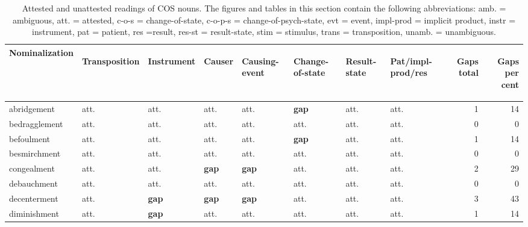 \begin{table}
\caption{Attested and unattested readings of COS nouns. The figures and tables in this section contain the following abbreviations: amb. = ambiguous, att. = attested, \mbox{c-o-s} = change-of-state, c-o-p-s = change-of-psych-state, evt = event, impl-prod = implicit product, instr = instrument, pat = patient, res =result, res-st = result-state, stim = stimulus, trans = transposition, unamb. = unambiguous.} 
\label{tab:GapsCOS}
\begin{tabular}{llllllllrr}
\lsptoprule
Nominalization             & \begin{sideways}Transposition\end{sideways} & \begin{sideways}Instrument\end{sideways} & \begin{sideways}Causer\end{sideways} & \begin{sideways}Causing-event\end{sideways} & \begin{sideways}Change-of-state\end{sideways} & \begin{sideways}Result-state\end{sideways} & \begin{sideways}Pat/impl-prod/res\end{sideways} & \begin{sideways}Gaps total\end{sideways} &
\begin{sideways}Gaps per cent\end{sideways}\\
\midrule
 abridgement& att.& att.& att. & att.& \textbf{gap} & att. & att. & 1 & 14 \\
bedragglement& att.& att.& att. & att.& att.& att. & att. & 0 & 0\\
 befoulment & att.& att.& att. & att.& \textbf{gap} & att. & att. & 1 & 14 \\
besmirchment & att.& att.& att. & att.& att.& att. & att. & 0 & 0 \\
 congealment& att.& att.& \textbf{gap}& \textbf{gap} & att.& att. & att. & 2 & 29 \\
debauchment& att.& att.& att. & att.& att.& att. & att. & 0 & 0 \\
 decenterment & att.& \textbf{gap} & \textbf{gap}& \textbf{gap} & att.& att. & att. & 3 & 43 \\
diminishment & att.& \textbf{gap} & att. & att.& att.& att.& att. & 1 & 14 \\

\end{tabular}
\end{table}
